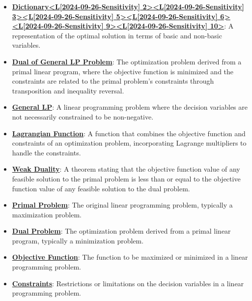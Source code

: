\documentclass{article}%
\begin{document}
\begin{itemize}[leftmargin=*]
\item \href{https://www.math.purdue.edu/~yipn/421/2024-09-26-Sensitivity.pdf#page=2}{\textbf{Dictionary<L{[}2024{-}09{-}26{-}Sensitivity{]} 2><L{[}2024{-}09{-}26{-}Sensitivity{]} 3><L{[}2024{-}09{-}26{-}Sensitivity{]} 5><L{[}2024{-}09{-}26{-}Sensitivity{]} 6><L{[}2024{-}09{-}26{-}Sensitivity{]} 9><L{[}2024{-}09{-}26{-}Sensitivity{]} 10>}}: A representation of the optimal solution in terms of basic and non-basic variables.%
\item \href{https://www.math.purdue.edu/~yipn/421/2024-10-01-DualGeneralLP.pdf#page=1}{\textbf{Dual of General LP Problem}}: The optimization problem derived from a primal linear program, where the objective function is minimized and the constraints are related to the primal problem's constraints through transposition and inequality reversal. %
\item \href{https://www.math.purdue.edu/~yipn/421/2024-10-01-DualGeneralLP.pdf#page=2}{\textbf{General LP}}: A linear programming problem where the decision variables are not necessarily constrained to be non-negative. %
\item \href{https://www.math.purdue.edu/~yipn/421/2024-10-01-DualGeneralLP.pdf#page=4}{\textbf{Lagrangian Function}}: A function that combines the objective function and constraints of an optimization problem, incorporating Lagrange multipliers to handle the constraints. %
\item \href{https://www.math.purdue.edu/~yipn/421/2024-10-01-DualGeneralLP.pdf#page=5}{\textbf{Weak Duality}}: A theorem stating that the objective function value of any feasible solution to the primal problem is less than or equal to the objective function value of any feasible solution to the dual problem. %
\item \href{https://www.math.purdue.edu/~yipn/421/2024-10-01-DualGeneralLP.pdf#page=1}{\textbf{Primal Problem}}: The original linear programming problem, typically a maximization problem. %
\item \href{https://www.math.purdue.edu/~yipn/421/2024-10-01-DualGeneralLP.pdf#page=1}{\textbf{Dual Problem}}: The optimization problem derived from a primal linear program, typically a minimization problem. %
\item \href{https://www.math.purdue.edu/~yipn/421/2024-10-01-DualGeneralLP.pdf#page=1}{\textbf{Objective Function}}: The function to be maximized or minimized in a linear programming problem. %
\item \href{https://www.math.purdue.edu/~yipn/421/2024-10-01-DualGeneralLP.pdf#page=1}{\textbf{Constraints}}: Restrictions or limitations on the decision variables in a linear programming problem. %

\end{itemize}
\end{document}
